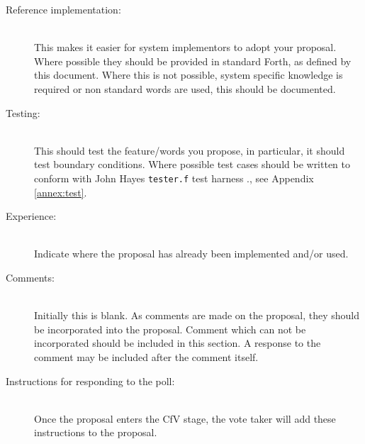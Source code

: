 \begin{description}
\item[Reference implementation:] ~\\
	This makes it easier for system implementors to adopt your proposal.
	Where possible they should be provided in standard Forth, as defined
	by this document.
	Where this is not possible, system specific knowledge is required or
	non standard words are used, this should be documented.

\item[Testing:] ~\\
 	This should test the feature/words you propose, in particular, it
	should test boundary conditions.\linebreak
	Where possible test cases should be written to conform with
	John Hayes \texttt{tester.f} test harness%
	\ifrelease.\else, see Appendix \ref{annex:test}.\fi

\item[Experience:] ~\\
	Indicate where the proposal has already been implemented and/or
	used.

\item[Comments:] ~\\
	Initially this is blank.  As comments are made on the proposal,
	they should be incorporated into the proposal.  Comment which can
	not be incorporated should be included in this section.  A response
	to the comment may be included after the comment itself.

\item[Instructions for responding to the poll:] ~\\
	Once the proposal enters the CfV stage, the vote taker will add
	these instructions to the proposal.
\end{description}
